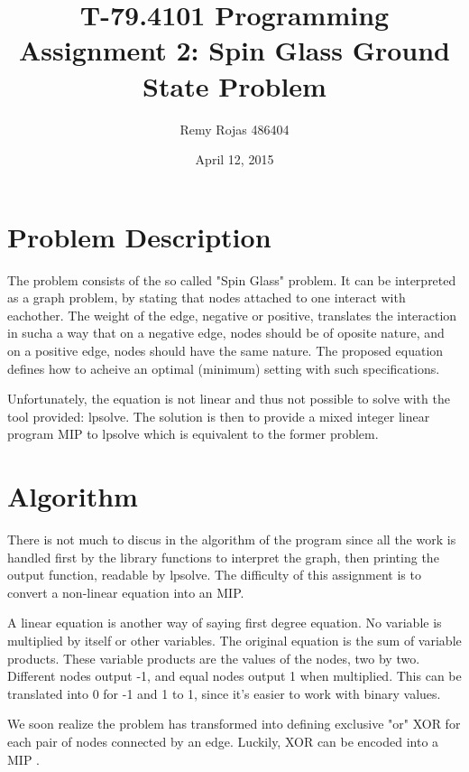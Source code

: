 \documentclass[11pt]{article}   %
\begin{document}
\title{T-79.4101 Programming Assignment 2: Spin Glass Ground State Problem}   
\author{Remy Rojas 486404}  %
\date{April 12, 2015}            %
\maketitle

\section{Problem Description}    

The problem consists of the so called "Spin Glass" problem. It can be interpreted as a graph problem, by stating that nodes attached to one interact with eachother. The weight of the edge, negative or positive, translates the interaction in sucha a way that on a negative edge, nodes should be of oposite nature, and on a positive edge, nodes should have the same nature.
The proposed equation defines how to acheive an optimal (minimum) setting with such specifications.

Unfortunately, the equation is not linear and thus not possible to solve with the tool provided: lpsolve. The solution is then to provide a mixed integer linear program MIP to lpsolve which is equivalent to the former problem.

\section{Algorithm}       

There is not much to discus in the algorithm of the program since all the work is handled first by the library functions to interpret the graph, then printing the output function, readable by lpsolve. The difficulty of this assignment is to convert a non-linear equation into an MIP.

A linear equation is another way of saying first degree equation. No variable is multiplied by itself or other variables.
The original equation is the sum of variable products.
These variable products are the values of the nodes, two by two.
Different nodes output -1, and equal nodes output 1 when multiplied. This can be translated into 0 for -1 and 1 to 1, since it's easier to work with binary values.

We soon realize the problem has transformed into defining exclusive "or" XOR for each pair of nodes connected by an edge.
Luckily, XOR can be encoded into a MIP \cite{MIP}.
\end{document}
